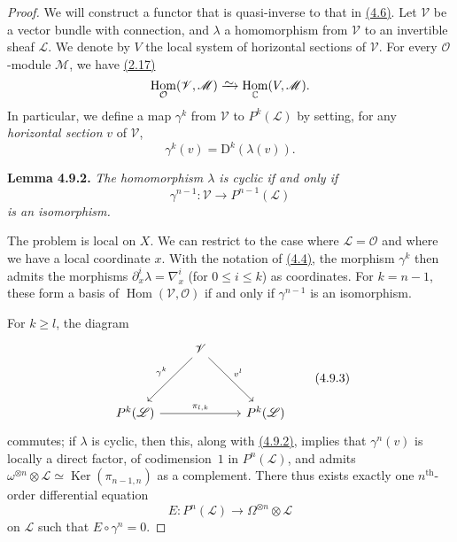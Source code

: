 \documentclass{report}
\newenvironment{itenv}[1]
  {\phantomsection\par\medskip\noindent\textbf{#1.}\itshape}
  {\medskip}
\newcommand{\scr}[1]{{\mathscr{#1}}}
\renewcommand{\cal}[1]{{\mathcal{#1}}}
\newcommand{\CC}{\mathbb{C}}
\newcommand{\DD}{\mathrm{D}}
\newcommand{\simto}{\xrightarrow{\raisebox{-0.7ex}[0ex][0ex]{$\sim$}}}
\renewcommand{\geq}{\geqslant}
\renewcommand{\leq}{\leqslant}
\DeclareMathOperator{\Ker}{Ker}
\DeclareMathOperator{\Hom}{Hom}
\newcommand{\oldpage}[1]{\marginpar{\footnotesize$\Big\vert$ \textit{p.~#1}}}
\begin{document}
\begin{proof}
  We will construct a functor that is quasi-inverse to that in \hyperref[I.4.6]{(4.6)}.
  Let $\scr{V}$ be a vector bundle with connection, and $\lambda$ a homomorphism from $\scr{V}$ to an invertible sheaf $\scr{L}$.
  We denote by $V$ the local system of horizontal sections of $\scr{V}$.
  For every $\cal{O}$-module $\scr{M}$, we have \hyperref[I.2.17]{(2.17)}
  \[
    \Hom_\cal{O}(\scr{V},\scr{M}) \simto \Hom_\CC(V,\scr{M}).
  \]
  In particular, we define a map $\gamma^k$ from $\scr{V}$ to $P^k(\scr{L})$ by setting, for any \emph{horizontal section} $v$ of $\scr{V}$,
  \[
  \label{I.4.9.1}
    \gamma^k(v) = \DD^k(\lambda(v)).
  \tag{4.9.1}
  \]

  \begin{itenv}{Lemma 4.9.2}
  \label{I.4.9.2}
    The homomorphism $\lambda$ is cyclic if and only if
    \[
      \gamma^{n-1}\colon \scr{V} \to P^{n-1}(\scr{L})
    \]
    is an isomorphism.
  \end{itenv}

  The problem is local on $X$.
  We can restrict to the case where $\scr{L}=\cal{O}$ and where we have a local coordinate $x$.
  With the notation of \hyperref[I.4.4]{(4.4)}, the morphism $\gamma^k$ then admits the morphisms $\partial_x^i\lambda = \nabla_x^i$ (for $0\leq i\leq k$) as coordinates.
  For $k=n-1$, these form a basis of $\Hom(\scr{V},\cal{O})$ if and only if $\gamma^{n-1}$ is an isomorphism.

  For $k\geq l$, the diagram
\oldpage{28}
  \[
  \label{I.4.9.3}
    \begin{tikzcd}[row sep=huge]
      & \scr{V} \dlar[swap,"\gamma^k"] \drar["v^l"] &
    \\P^k(\scr{L}) \ar[rr,"\pi_{l,k}"] && P^k(\scr{L})
    \end{tikzcd}
  \tag{4.9.3}
  \]
  commutes;
  if $\lambda$ is cyclic, then this, along with \hyperref[I.4.9.2]{(4.9.2)}, implies that $\gamma^n(v)$ is locally a direct factor, of codimension~$1$ in $P^n(\scr{L})$, and admits $\omega^{\otimes n}\otimes\scr{L} \simeq \Ker(\pi_{n-1,n})$ as a complement.
  There thus exists exactly one $n^\mathrm{th}$-order differential equation
  \[
    E\colon P^n(\scr{L}) \to \Omega^{\otimes n}\otimes\scr{L}
  \]
  on $\scr{L}$ such that $E\circ\gamma^n=0$.


\end{proof}
\end{document}
